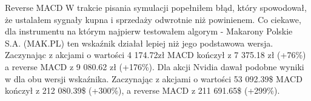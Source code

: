\documentclass{article}
\begin{document}
\begin{section}{Reverse MACD}
    W trakcie pisania symulacji popełniłem błąd, który spowodował, że ustalałem sygnały kupna i sprzedaży odwrotnie niż powinienem. Co ciekawe, dla instrumentu
    na którym najpierw testowałem algorym - Makarony Polskie S.A. (MAK.PL) ten wskaźnik działał lepiej niż jego podstawowa wersja. Zaczynając z akcjami o wartości 4 174.72zł 
    MACD kończył z 7 375.18 zł (+76\%) a reverse MACD z 9 080.62 zł (+176\%). Dla akcji Nvidia dawał podobne wyniki w dla obu wersji wskaźnika. 
    Zaczynając z akcjami o wartości 53 092.39\$ MACD kończył z 212 080.39\$ (+300\%), 
    a reverse MACD z 211 691.65\$ (+299\%).
    \begin{figure}[H]
        \centering
    \end{figure}
    \begin{figure}[H]

\end{figure}
\end{section}
\end{document}
